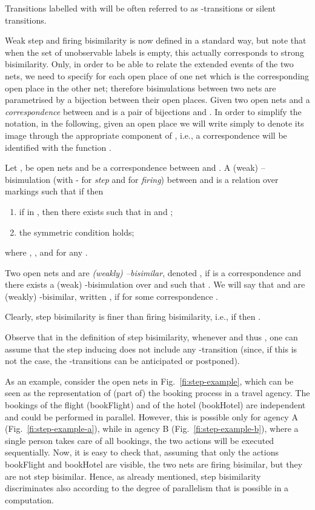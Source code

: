 \documentclass{LMCS}
\begin{document}
Transitions labelled with  will be often referred to as
-transitions or silent transitions.

Weak step and firing bisimilarity is now defined in a standard way,
but note that when the set of unobservable labels is empty, this
actually  corresponds to strong bisimilarity. 
Only, in order to be able to relate the extended events of the two
nets, we need to specify for each open place of one net which is the
corresponding open place in the other net; therefore bisimulations
between two nets are parametrised by a bijection between their open
places.
Given two open nets  and  a \emph{correspondence}
 between  and  is a
pair of bijections  and . In order to simplify the notation, in the following, given an
open place  we will write simply 
to denote its image through the appropriate component of , i.e.,
a correspondence  will be
identified with the function .

\begin{defi}
  \label{de:weak-bisim}
  Let ,  be open nets and  be a correspondence between  and .
A (weak) --bisimulation (with  -  for \emph{step} and  for \emph{firing})
  between  and  is a relation over markings  such that if  then

  \begin{enumerate}[]


  \item if  in , then there exists
     such that  in
     and ;

  \item the symmetric condition holds;

  \end{enumerate}
  where , , and
   for any .

  Two open nets  and  are \emph{(weakly)
    --bisimilar}, denoted , if
   is a correspondence and there
  exists a (weak) -bisimulation  over  and
   such that .  We will
  say that  and  are (weakly) -bisimilar,
  written , if  for some correspondence .
\end{defi}
Clearly, step bisimilarity is finer than firing bisimilarity, i.e., if  then .

Observe that in the definition of step bisimilarity, whenever  and thus , one can assume that the step inducing
 does not include any -transition (since, if
this is not the case, the -transitions can be anticipated or
postponed).

As an example, consider the open nets in Fig.~\ref{fi:step-example},
which can be seen as the representation of (part of) the booking
process in a travel agency. The bookings of the flight
(\textsf{bookFlight}) and of the hotel (\textsf{bookHotel}) are
independent and could be performed in parallel. However, this is
possible only for agency A (Fig.~\ref{fi:step-example-a}), while in
agency B (Fig.~\ref{fi:step-example-b}), where a single person takes care
of all bookings, the two actions will be executed sequentially.
Now, it is easy to check that, assuming that only the actions
\textsf{bookFlight} and \textsf{bookHotel} are visible, the two nets
are firing bisimilar, but they are not step bisimilar.
Hence, as already mentioned, step bisimilarity discriminates
also according to the degree of parallelism that is possible in a
computation.
\end{document}
